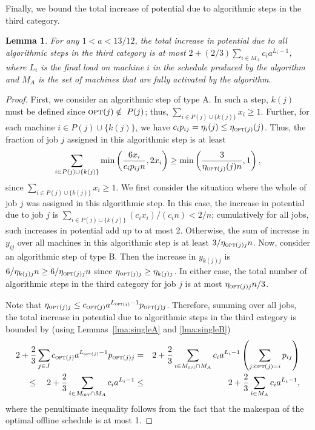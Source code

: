 \documentclass[11pt]{article}
\newcommand{\opt}{{\text{\sc opt}}}
\newtheorem{lemma}{Lemma}
\begin{document}
\noindent
Finally, we bound the total increase of potential due to algorithmic 
steps in the third category.
\begin{lemma}
\label{lma:category3}
For any $1 < a < 13/12$,
the total increase in potential due to all algorithmic steps in the third 
category is at most $2 + (2/3)\sum_{i\in M_A} c_i a^{L_i - 1}$, 
where $L_i$ is the final load on machine $i$ in the schedule produced
by the algorithm and $M_A$ is the set of machines that are fully 
activated by the algorithm.
\end{lemma}
\begin{proof}
First,
we consider an algorithmic step of type A. In such a step, $k(j)$ must 
be defined since $\opt (j)\notin~P(j)$; thus,
$\sum_{i\in P(j)\cup \{k(j)\}} x_i \geq 1$. Further, for each machine
$i\in P(j)\cup \{k(j)\}$, we have 
$c_i p_{ij} = \eta_i(j) \leq \eta_{\opt (j)}(j)$.
Thus, the fraction of job $j$ assigned in this algorithmic step is at least
\begin{equation*}
\sum_{i\in P(j)\cup \{k(j)\}} \min\left(\frac{6 x_i}{c_i p_{ij} n}, 2x_i \right) \geq \min\left(\frac{3}{\eta_{\opt (j)}(j) n}, 1\right),
\end{equation*}
since $\sum_{i\in P(j)\cup\{k(j)\}} x_i \geq 1$.
We first consider the situation where the whole of job $j$ was assigned 
in this algorithmic step. In this case, the increase in potential due
to job $j$ is 
$\sum_{i\in P(j)\cup \{k(j)\}} (c_i x_i)/(c_i n) < 2/n$; cumulatively for
all jobs, such increases in potential add up to at most 2.
Otherwise, the sum of increase in $y_{ij}$ over all machines in 
this algorithmic step is at least $3/\eta_{\opt (j)j} n$. 
Now, consider an algorithmic step of type B.
Then the increase in $y_{k(j)j}$ is $6/\eta_{k(j)j} n \geq 6/\eta_{\opt (j)j} n$ 
since $\eta_{\opt (j)j} \geq \eta_{k(j)j}$. In either case, 
the total number of algorithmic steps in the third category
for job $j$ is at most $\eta_{\opt (j)j} n/3$. 

Note that $\eta_{\opt (j)j} \leq c_{\opt (j)} a^{L_{\opt (j)}-1} p_{\opt (j)j}$.
Therefore, summing over all jobs, the total increase in potential 
due to algorithmic steps in the third category is bounded by 
(using Lemmas~\ref{lma:singleA} and \ref{lma:singleB})
\begin{eqnarray*}
2 + \frac{2}{3} \sum_{j\in J} c_{\opt (j)} a^{L_{\opt (j)}-1} p_{\opt (j)j}
& = & 2 + \frac{2}{3} \sum_{i\in M_{\opt} \cap M_A} c_i a^{L_i-1} \left(\sum_{j: \opt (j) = i} p_{ij} \right) \\
\quad \leq \quad 2 + \frac{2}{3} \sum_{i\in M_{\opt} \cap M_A} c_i a^{L_i-1}
& \leq & 2 + \frac{2}{3} \sum_{i\in M_A} c_i a^{L_i-1},
\end{eqnarray*}
where the penultimate inequality follows from the fact that the
makespan of the optimal offline schedule is at most 1.
\end{proof}
\end{document}
